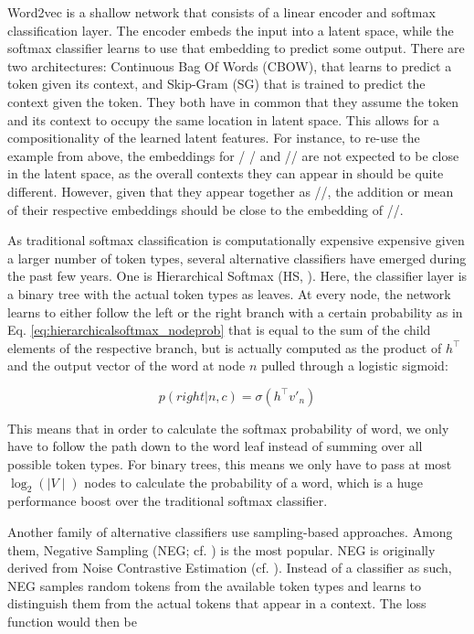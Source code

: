 \documentclass[6pt]{article}
\begin{document}
Word2vec is a shallow network that consists of a linear encoder and softmax classification layer. The encoder embeds the input into a latent space, while the softmax classifier learns to use that embedding to predict some output. There are two architectures: Continuous Bag Of Words (CBOW), that learns to predict a token given its context, and Skip-Gram (SG) that is trained to predict the context given the token. They both have in common that they assume the token and its context to occupy the same location in latent space. This allows for a compositionality of the learned latent features. For instance, to re-use the example from above, the embeddings for / / and // are not expected to be close in the latent space, as the overall contexts they can appear in should be quite different. However, given that they appear together as //, the addition or mean of their respective embeddings should be close to the embedding of //.

As traditional softmax classification is computationally expensive expensive given a larger number of token types, several alternative classifiers have emerged during the past few years. One is Hierarchical Softmax (HS, \cite{morin2005hierarchical}). Here, the classifier layer is a binary tree with the actual token types as leaves. At every node, the network learns to either follow the left or the right branch with a certain probability as in Eq. \ref{eq:hierarchicalsoftmax_nodeprob} that is equal to the sum of the child elements of the respective  branch, but is actually computed as the product of $h^\top$ and the output vector of the word at node $n$ pulled through a logistic sigmoid:

\begin{equation}
p(right|n,c) = \sigma(h^\top v'_n) 
\label{eq:hierarchicalsoftmax_nodeprob}
\end{equation}

This means that in order to calculate the softmax probability of word, we only have to follow the path down to the word leaf instead of summing over all possible token types. For binary trees, this means we only have to pass at most $\log_2(\mid V\mid)$ nodes to calculate the probability of a word, which is a huge performance boost over the traditional softmax classifier. 

Another family of alternative classifiers use sampling-based approaches. Among them, Negative Sampling (NEG; cf. \cite{goldberg2014word2vec}) is the most popular. NEG is originally derived from Noise Contrastive Estimation (cf. \cite{gutmann2010noise,mnih2012fast}). Instead of a classifier as such, NEG samples random tokens from the available token types and learns to distinguish them from the actual tokens that appear in a context. The loss function would then be
\end{document}
